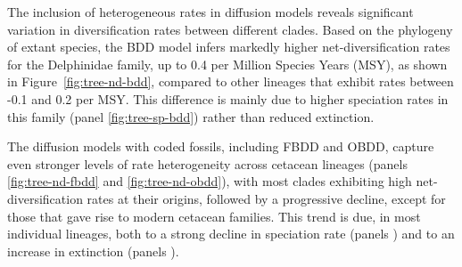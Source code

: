 \documentclass[oupdraft]{sysbio}
\newcommand{\revised}[1]{{\color{blue} #1}}
\begin{document}
The inclusion of heterogeneous rates in diffusion models reveals significant variation in diversification rates between different clades. Based on the phylogeny of extant species, the BDD model infers markedly higher net-diversification rates for the Delphinidae family, up to 0.4 per Million Species Years (MSY), as shown in Figure~\ref{fig:tree-nd-bdd}, compared to other lineages that exhibit rates between -0.1 and 0.2 per MSY. This difference is mainly due to higher speciation rates in this family (panel \ref{fig:tree-sp-bdd}) rather than reduced extinction.

The diffusion models with \revised{coded} fossils, including FBDD and OBDD, capture even stronger levels of rate heterogeneity across cetacean lineages (panels \ref{fig:tree-nd-fbdd} and \ref{fig:tree-nd-obdd}), with most clades exhibiting high net-diversification rates at their origins, followed by a progressive decline, except for those that gave rise to modern cetacean families. This trend is due, in most individual lineages, both to a strong decline in speciation rate (panels ) and to an increase in extinction (panels ).
\end{document}

